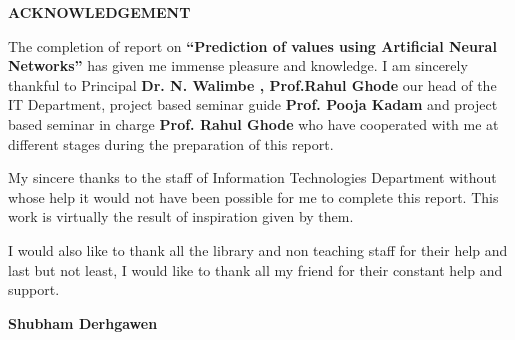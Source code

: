 \documentclass[12pt,times,a4paper]{report}
\renewcommand{\baselinestretch}{1.5}
\begin{document}
\newpage
\begin{center}
\thispagestyle{empty}
\renewcommand{\baselinestretch}{1.5}
{\fontsize{12}{10} \bf ACKNOWLEDGEMENT}\\
\begin{enumerate}
\vspace{0.4in}
The completion of report on \textbf{“Prediction of values using Artificial Neural Networks”} has given me immense pleasure and knowledge. I am sincerely thankful to Principal \textbf{Dr. N. Walimbe , Prof.Rahul Ghode} our head of the IT Department, project based seminar guide \textbf{Prof. Pooja Kadam } and project based seminar in charge \textbf{Prof. Rahul Ghode} who have cooperated with me at different stages during the preparation of this report.

My sincere thanks to the staff of Information Technologies Department without whose help it
would not have been possible for me to complete this report. This work is virtually the result of
inspiration given by them.

I would also like to thank all the library and non teaching staff for their help and last but not
least, I would like to thank all my friend for their constant help and support.

\end{enumerate}
\end{center}
\vspace*{0.8in}
{\bf Shubham Derhgawen}\\


\newpage


\newpage






\end{document}

